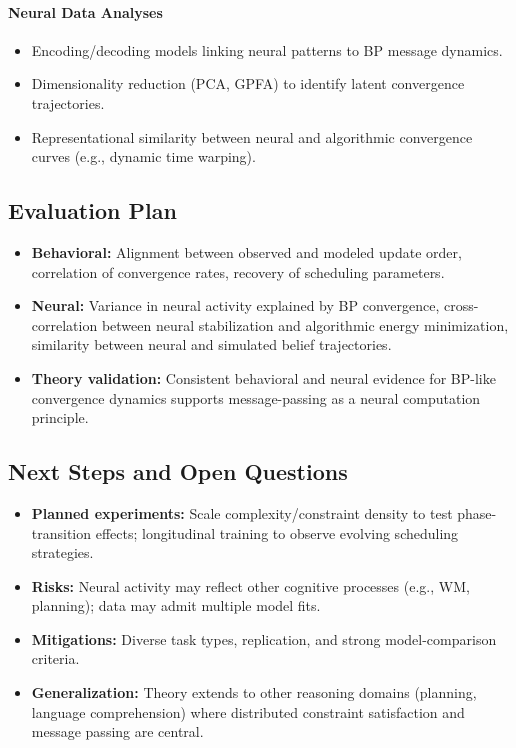         \paragraph{Neural Data Analyses}
            \begin{itemize}
                \item Encoding/decoding models linking neural patterns to BP message dynamics.
                \item Dimensionality reduction (PCA, GPFA) to identify latent convergence trajectories.
                \item Representational similarity between neural and algorithmic convergence curves (e.g., dynamic time warping).
            \end{itemize}
    
    \subsection{Evaluation Plan}
        \begin{itemize}
            \item \textbf{Behavioral:} Alignment between observed and modeled update order, correlation of convergence rates, recovery of scheduling parameters.
            \item \textbf{Neural:} Variance in neural activity explained by BP convergence, cross-correlation between neural stabilization and algorithmic energy minimization, similarity between neural and simulated belief trajectories.
            \item \textbf{Theory validation:} Consistent behavioral and neural evidence for BP-like convergence dynamics supports message-passing as a neural computation principle.
        \end{itemize}

\subsection{Next Steps and Open Questions}
    \begin{itemize}
        \item \textbf{Planned experiments:} Scale complexity/constraint density to test phase-transition effects; longitudinal training to observe evolving scheduling strategies.
        \item \textbf{Risks:} Neural activity may reflect other cognitive processes (e.g., WM, planning); data may admit multiple model fits.
        \item \textbf{Mitigations:} Diverse task types, replication, and strong model-comparison criteria.
        \item \textbf{Generalization:} Theory extends to other reasoning domains (planning, language comprehension) where distributed constraint satisfaction and message passing are central.
    \end{itemize}
    
